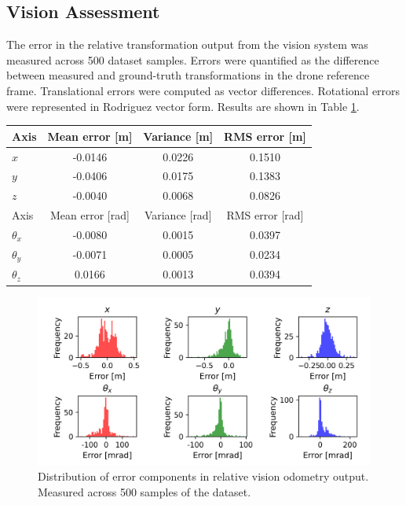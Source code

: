 \documentclass[bare_jrnl_transmag]{subfiles}
\begin{document}
\subsection{Vision Assessment}
The error in the relative transformation output from the vision system was measured across 500 dataset samples. Errors were quantified as the difference between measured and ground-truth transformations in the drone reference frame. Translational errors were computed as vector differences. Rotational errors were represented in Rodriguez vector form. Results are shown in Table \ref{tab:vision-error-stats}.

\begin{table}[H]
    \centering
    \begin{tabular}{lccc}
    \hline
    Axis & Mean error [m] & Variance [m] & RMS error [m] \\ \hline
    $x$ & -0.0146 & 0.0226 & 0.1510 \\
    $y$ & -0.0406 & 0.0175 & 0.1383 \\
    $z$ & -0.0040 & 0.0068 & 0.0826 \\ \hline
    Axis & Mean error [rad] & Variance [rad] & RMS error [rad] \\ \hline
    $\theta_x$ & -0.0080 & 0.0015 & 0.0397 \\
    $\theta_y$ & -0.0071 & 0.0005 & 0.0234 \\
    $\theta_z$ & 0.0166 & 0.0013 & 0.0394 \\ \hline
    \end{tabular}
    \label{tab:vision-error-stats}
\end{table}

\begin{figure}[H]
    \centering
    \includegraphics[width=0.9\linewidth]{figures/vision_error.png}
    \caption{Distribution of error components in relative vision odometry output. Measured across 500 samples of the dataset.}
    \label{fig:vision-error-results}
\end{figure}
\end{document}
